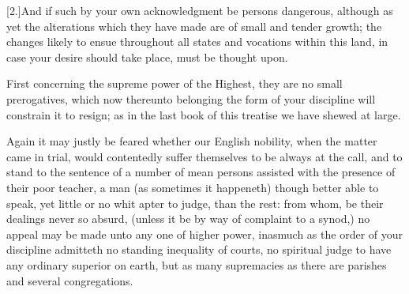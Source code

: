 [2.]And if such by your own acknowledgment be persons dangerous, although as yet the alterations which they have made are of small and tender growth; the changes likely to ensue throughout all states and vocations within this land, in case your desire should take place, must be thought upon.

First concerning the supreme power of the Highest, they are no small prerogatives, which now thereunto belonging the form of your discipline will constrain it to resign; as in the last book of this treatise we have shewed at large.

Again it may justly be feared whether our English nobility, when the matter came in trial, would contentedly suffer themselves to be always at the call, and to stand to the sentence of a number of mean persons assisted with the presence of their poor teacher, a man (as sometimes it happeneth) though better able to speak, yet little or no whit apter to judge, than the rest: from whom, be their dealings never so absurd, (unless it be by way of complaint to a synod,) no appeal may be made unto any one of higher power, inasmuch as the order of your discipline admitteth no standing inequality of courts, no spiritual judge to have any ordinary superior on earth, but as many supremacies as there are parishes and several congregations.

